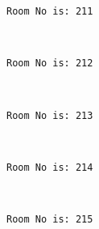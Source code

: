 \documentclass[11pt]{article}
\begin{document}
    \begin{Verbatim}[commandchars=\\\{\}]
Room No is: 211

    \end{Verbatim}

    \begin{center}
    \end{center}
    { \hspace*{\fill} \\}
    
    \begin{Verbatim}[commandchars=\\\{\}]
Room No is: 212

    \end{Verbatim}

    \begin{center}
    \end{center}
    { \hspace*{\fill} \\}
    
    \begin{Verbatim}[commandchars=\\\{\}]
Room No is: 213

    \end{Verbatim}

    \begin{center}
    \end{center}
    { \hspace*{\fill} \\}
    
    \begin{Verbatim}[commandchars=\\\{\}]
Room No is: 214

    \end{Verbatim}

    \begin{center}
    \end{center}
    { \hspace*{\fill} \\}
    
    \begin{Verbatim}[commandchars=\\\{\}]
Room No is: 215

    \end{Verbatim}
\end{document}
